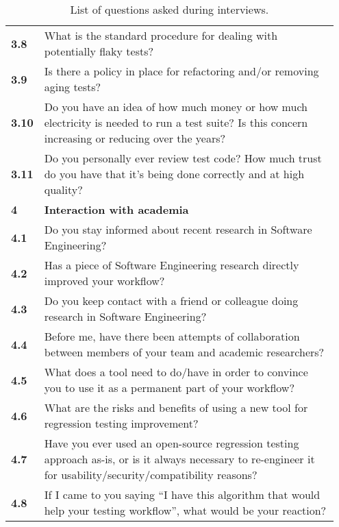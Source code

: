 \begin{table}[]
\begin{tabular}{p{0.05\linewidth}p{0.9\linewidth}}
\textbf{3.8} & What is the standard procedure for dealing with potentially flaky tests? \\
\textbf{3.9} & Is there a policy in place for refactoring and/or removing aging tests? \\
\textbf{3.10} & Do you have an idea of how much money or how much electricity is needed to run a test suite? Is this concern increasing or reducing over the years? \\
\textbf{3.11} & Do you personally ever review test code? How much trust do you have that it's being done correctly and at high quality? \\
\midrule
\textbf{4} & \textbf{Interaction with academia} \\
\textbf{4.1} & Do you stay informed about recent research in Software Engineering? \\
\textbf{4.2} & Has a piece of Software Engineering research directly improved your workflow? \\
\textbf{4.3} & Do you keep contact with a friend or colleague doing research in Software Engineering? \\
\textbf{4.4} & Before me, have there been attempts of collaboration between members of your team and academic researchers? \\
\textbf{4.5} & What does a tool need to do/have in order to convince you to use it as a permanent part of your workflow? \\
\textbf{4.6} & What are the risks and benefits of using a new tool for regression testing improvement? \\
\textbf{4.7} & Have you ever used an open-source regression testing approach as-is, or is it always necessary to re-engineer it for usability/security/compatibility reasons? \\
\textbf{4.8} & If I came to you saying ``I have this algorithm that would help your testing workflow'', what would be your reaction? \\
\bottomrule
\end{tabular}\\
\caption{List of questions asked during interviews.}
\label{table:interview_questions}
\end{table}